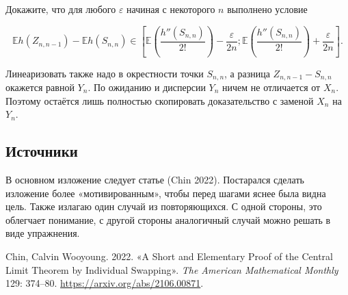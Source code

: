 \documentclass[
  letterpaper,
  DIV=11,
  numbers=noendperiod]{scrartcl}
\newlength{\cslhangindent}
\newlength{\cslentryspacingunit} %
\newenvironment{CSLReferences}[2] %
 {%
  \setlength{\parindent}{0pt}
  \ifodd #1
  \let\oldpar\par
  \def\par{\hangindent=\cslhangindent\oldpar}
  \fi
  \setlength{\parskip}{#2\cslentryspacingunit}
 }%
 {}
\newcommand\E{{\mathbb{E}}}
\begin{document}
\begin{tcolorbox}[enhanced jigsaw, breakable, colbacktitle=quarto-callout-caution-color!10!white, opacitybacktitle=0.6, colback=white, bottomrule=.15mm, arc=.35mm, title=\textcolor{quarto-callout-caution-color}{\faFire}\hspace{0.5em}{Упражнение к теореме}, leftrule=.75mm, rightrule=.15mm, opacityback=0, left=2mm, toptitle=1mm, bottomtitle=1mm, colframe=quarto-callout-caution-color-frame, titlerule=0mm, coltitle=black, toprule=.15mm]
Докажите, что для любого \(\varepsilon\) начиная с некоторого \(n\)
выполнено условие

\[
\E h(Z_{n,n-1}) - \E h(S_{n,n}) \in \left[ \E\left(\frac{h''(S_{n,n})}{2!}\right) - \frac{\varepsilon}{2n}; \E\left(\frac{h''(S_{n,n})}{2!}\right) + \frac{\varepsilon}{2n} \right].
\]
\end{tcolorbox}

\begin{tcolorbox}[enhanced jigsaw, breakable, colbacktitle=quarto-callout-caution-color!10!white, opacitybacktitle=0.6, colback=white, bottomrule=.15mm, arc=.35mm, title=\textcolor{quarto-callout-caution-color}{\faFire}\hspace{0.5em}{Решение упражнения к теореме}, leftrule=.75mm, rightrule=.15mm, opacityback=0, left=2mm, toptitle=1mm, bottomtitle=1mm, colframe=quarto-callout-caution-color-frame, titlerule=0mm, coltitle=black, toprule=.15mm]
Линеаризовать также надо в окрестности точки \(S_{n,n}\), а разница
\(Z_{n,n-1}-S_{n,n}\) окажется равной \(Y_n\). По ожиданию и дисперсии
\(Y_n\) ничем не отличается от \(X_n\). Поэтому остаётся лишь полностью
скопировать доказательство с заменой \(X_n\) на \(Y_n\).
\end{tcolorbox}

\hypertarget{ux438ux441ux442ux43eux447ux43dux438ux43aux438}{%
\subsection{Источники}\label{ux438ux441ux442ux43eux447ux43dux438ux43aux438}}

В основном изложение следует статье (Chin 2022). Постарался сделать
изложение более «мотивированным», чтобы перед шагами яснее была видна
цель. Также излагаю один случай из повторяющихся. С одной стороны, это
облегчает понимание, с другой стороны аналогичный случай можно решать в
виде упражнения.

\hypertarget{refs}{}
\begin{CSLReferences}{1}{0}
\leavevmode{}%
Chin, Calvin Wooyoung. 2022. {«A Short and Elementary Proof of the
Central Limit Theorem by Individual Swapping»}. \emph{The American
Mathematical Monthly} 129: 374--80.
\url{https://arxiv.org/abs/2106.00871}.

\end{CSLReferences}
\end{document}
